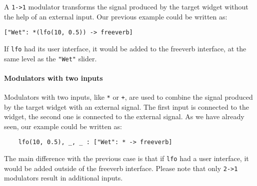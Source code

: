 A \lstinline`1->1` modulator transforms the signal produced by the target widget without the help of an external input. Our previous example could be written as:

\begin{lstlisting}
["Wet": *(lfo(10, 0.5)) -> freeverb]
\end{lstlisting}

If \lstinline'lfo' had its user interface, it would be added to the freeverb interface, at the same level as the \lstinline'"Wet"' slider.

\paragraph{Modulators with two inputs}

Modulators with two inputs, like \lstinline'*' or \lstinline'+', are used to combine the signal produced by the target widget with an external signal. The first input is connected to the widget, the second one is connected to the external signal. As we have already seen, our example could be written as:

\begin{lstlisting}
    lfo(10, 0.5), _, _ : ["Wet": * -> freeverb]
\end{lstlisting}
    
The main difference with the previous case is that if \lstinline`lfo` had a user interface, it would be added outside of the freeverb interface. Please note that only \lstinline`2->1` modulators result in additional inputs. 

